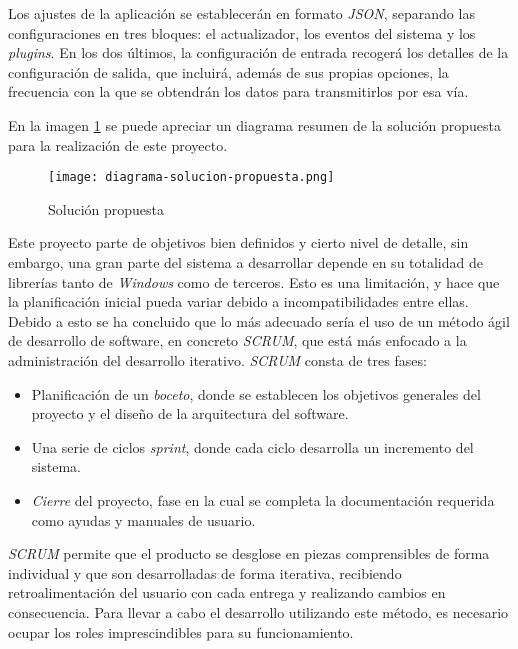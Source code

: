     Los ajustes de la aplicación se establecerán en formato \textit{JSON}, separando las configuraciones en tres bloques: el actualizador, los eventos del sistema y los \textit{plugins}. En los dos últimos, la configuración de entrada recogerá los detalles de la configuración de salida, que incluirá, además de sus propias opciones, la frecuencia con la que se obtendrán los datos para transmitirlos por esa vía.
    
    En la imagen \ref{fig:proposed-solution-diagram} se puede apreciar un diagrama resumen de la solución propuesta para la realización de este proyecto.
    
    \begin{figure}[h!]
    \centering
        \texttt{[image: diagrama-solucion-propuesta.png]}
        \caption{Solución propuesta}
        \label{fig:proposed-solution-diagram}
    \end{figure}
    
    Este proyecto parte de objetivos bien definidos y cierto nivel de detalle, sin embargo, una gran parte del sistema a desarrollar depende en su totalidad de librerías tanto de \textit{Windows} como de terceros. Esto es una limitación, y hace que la planificación inicial pueda variar debido a incompatibilidades entre ellas. Debido a esto se ha concluido que lo más adecuado sería el uso de un método ágil de desarrollo de software, en concreto \textit{SCRUM}, que está más enfocado a la administración del desarrollo iterativo. \textit{SCRUM} consta de tres fases:
        
    \begin{itemize}
        \item Planificación de un \textit{boceto}, donde se establecen los objetivos generales del proyecto y el diseño de la arquitectura del software.
        
        \item Una serie de ciclos \textit{sprint}, donde cada ciclo desarrolla un incremento del sistema.
        
        \item \textit{Cierre} del proyecto, fase en la cual se completa la documentación requerida como ayudas y manuales de usuario.
    \end{itemize}

    \textit{SCRUM} permite que el producto se desglose en piezas comprensibles de forma individual y que son desarrolladas de forma iterativa, recibiendo retroalimentación del usuario con cada entrega y realizando cambios en consecuencia. Para llevar a cabo el desarrollo utilizando este método, es necesario ocupar los roles imprescindibles para su funcionamiento.


